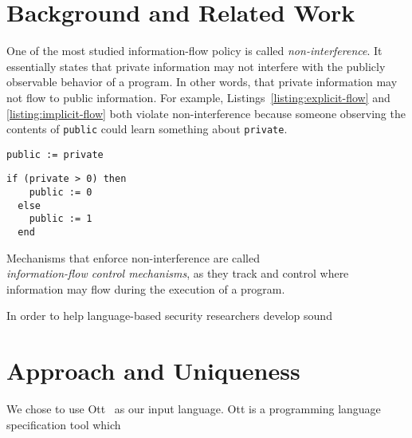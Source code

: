 \documentclass[sigplan,10pt]{acmart}\settopmatter{printfolios=true,printccs=false,printacmref=false}
\begin{document}


\section{Background and Related Work}
One of the most studied information-flow policy is called \emph{non-interference}. It essentially states that private information may not interfere with the publicly observable behavior of a program. In other words, that private information may not flow to public information. For example, Listings~\ref{listing:explicit-flow} and \ref{listing:implicit-flow} both violate non-interference because someone observing the contents of \lstinline{public} could learn something about \lstinline{private}.

\begin{lstlisting}[captionpos=b, caption=Insecure explicit flow, label=listing:explicit-flow]
  public := private
\end{lstlisting}

\begin{lstlisting}[captionpos=b, caption=Insecure implicit flow, label=listing:implicit-flow]
  if (private > 0) then
    public := 0
  else
    public := 1
  end
\end{lstlisting}
Mechanisms that enforce non-interference are called \\\emph{information-flow control mechanisms}, as they track and control where information may flow during the execution of a program.



In order to help language-based security researchers develop sound




\section{Approach and Uniqueness}
We chose to use Ott~\cite{DBLP:journals/jfp/SewellNOPRSS10} as our input language. Ott is a programming language specification tool which 
\end{document}
